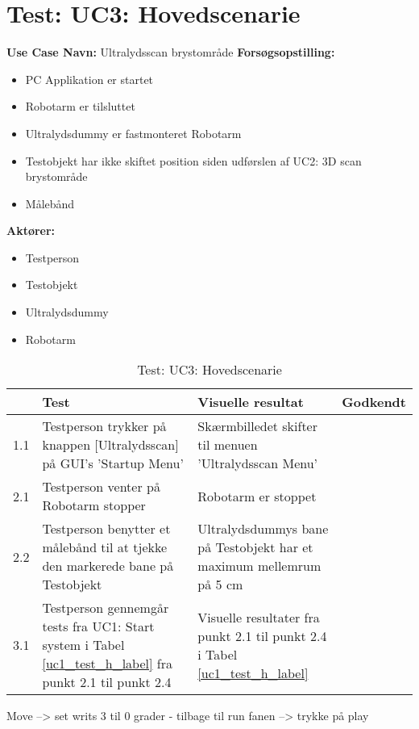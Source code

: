 
\section{Test: UC3: Hovedscenarie}
\textbf{Use Case Navn:} Ultralydsscan brystområde \newline
\textbf{Forsøgsopstilling:}
\begin{itemize}
\item PC Applikation er startet
\item Robotarm er tilsluttet
\item Ultralydsdummy er fastmonteret Robotarm
\item Testobjekt har ikke skiftet position siden udførslen af UC2: 3D scan brystområde
\item Målebånd 
\end{itemize}  
\textbf{Aktører:}
\begin{itemize}
\item Testperson
\item Testobjekt
\item Ultralydsdummy 
\item Robotarm
\end{itemize}  

\begin{table}[htb]
\begin{tabularx}{\textwidth}{|p{0.5cm}|X|X|p{2cm}|}
\hline
\textbf{} & \textbf{Test} & \textbf{Visuelle resultat} &\textbf{Godkendt} \\\hline
1.1 & Testperson trykker på knappen [Ultralydsscan] på GUI's 'Startup Menu' & Skærmbilledet skifter til menuen 'Ultralydsscan Menu' & \\\hline
2.1 & Testperson venter på Robotarm stopper & Robotarm er stoppet & \\\hline
2.2 &  Testperson benytter et målebånd til at tjekke den markerede bane på Testobjekt & Ultralydsdummys bane på Testobjekt har et maximum mellemrum på 5 cm & \\\hline
3.1 & Testperson gennemgår tests fra UC1: Start system i Tabel \ref{uc1_test_h_label} fra punkt 2.1 til punkt 2.4  & Visuelle resultater fra punkt 2.1 til punkt 2.4 i Tabel \ref{uc1_test_h_label} & \\ \hline
\end{tabularx}
    \caption{Test: UC3: Hovedscenarie} 
    \label{uc3_test_h_label}  
\end{table}
\newpage


Move --> set writs 3 til 0 grader - tilbage til run fanen --> trykke på play 

